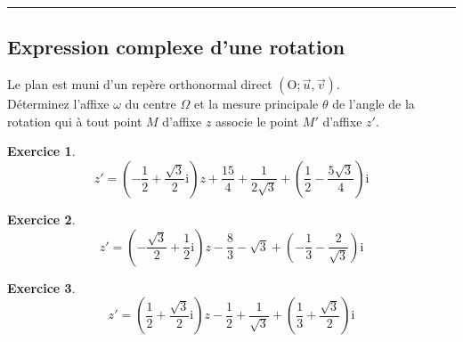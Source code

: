 \documentclass[a4paper]{article}
\newtheorem{Exercice}{Exercice}
\begin{document}
\hrule
\begin{minipage}{0.55\linewidth}
\vspace{0.5cm}
 \begin{center}
\subsection*{Expression complexe d'une rotation}
\end{center}%
\vspace{0.5cm}
Le plan est muni d'un rep\`ere orthonormal direct $\left(\mathrm{O};\vec{u},\vec{v}\right)$.\\D\'eterminez l'affixe $\omega$ du centre $\Omega$ et la mesure principale $\theta$ de l'angle de la rotation qui \`a tout point $M$ d'affixe $z$ associe le point $M'$ d'affixe $z'$.
\begin{Exercice}\[
\displaystyle z'=\left(-\frac{1}{2}+\frac{\sqrt{3}}{2}\mathrm{i}\right)z+\frac{15}{4}+\frac{1}{2 \sqrt{3}}+\left(\frac{1}{2}-\frac{5 \sqrt{3}}{4}\right)\mathrm{i}\]
\end{Exercice}\begin{Exercice}\[
\displaystyle z'=\left(-\frac{\sqrt{3}}{2}+\frac{1}{2}\mathrm{i}\right)z-\frac{8}{3}-\sqrt{3}+\left(-\frac{1}{3}-\frac{2}{\sqrt{3}}\right)\mathrm{i}\]
\end{Exercice}
\begin{Exercice}\[
 z'=\left(\frac{1}{2}+\frac{\sqrt{3}}{2}\mathrm{i}\right)z-\frac{1}{2}+\frac{1}{\sqrt{3}}+\left(\frac{1}{3}+\frac{\sqrt{3}}{2}\right)\mathrm{i}\]
\end{Exercice}

\end{minipage}\hfill%
\end{document}
